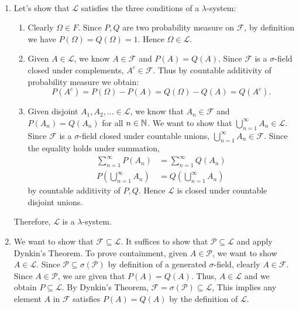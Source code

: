 \documentclass[12pt]{article}
\begin{document}
\begin{problem}[5]
~\begin{enumerate}[label=\alph*)]
	\item Let's show that $ \mathscr{L}$ satisfies the three conditions of a $\lambda$-system:
		\begin{enumerate}[label=(\roman*)]
			\item Clearly $ \Omega \in F$. Since $ P,Q$ are two probability measure on  $ \mathcal{F}$, by definition we have $ P(\Omega)=Q(\Omega)=1$. Hence $ \Omega \in \mathscr{L}$.
			\item Given $ A \in \mathscr{L}$, we know $ A \in \mathcal{F}$ and $ P(A) = Q(A)$. Since  $ \mathcal{F}$ is a $\sigma$-field closed under complements, $ A^{c} \in \mathcal{F}$. Thus by countable additivity of probability measure we obtain:
				\[
					P(A^{c}) = P(\Omega) - P(A) = Q(\Omega) - Q(A) = Q(A^{c})
				.\] 
			\item Given disjoint $ A_1, A_2, \ldots \in \mathscr{L}$, we know that $ A_n \in \mathcal{F}$ and $ P(A_n) = Q(A_n)$ for all $ n \in \mathbb{N}$. We want to show that $ \bigcup_{ n =1}^{\infty} A_n \in \mathscr{L}$. Since $ \mathcal{F}$ is a $\sigma$-field closed under countable unions, $ \bigcup_{ n =1}^{\infty} A_n \in \mathcal{F}$. Since the equality holds under summation,
				\begin{align*}
					\sum_{ n= 1}^{\infty} P(A_n) &= \sum_{ n= 1}^{\infty} Q(A_n) \\
					P\left( \bigcup_{ n =1}^{\infty} A_n \right) &=  Q\left( \bigcup_{ n =1}^{\infty} A_n \right)
				\end{align*}
by countable additivity of $P,Q$. Hence  $ \mathscr{L}$ is closed under countable disjoint unions. 
		\end{enumerate}
		Therefore, $ \mathscr{L}$ is a $\lambda$-system.
	\item We want to show that $ \mathcal{F} \subseteq \mathscr{L}$. It suffices to show that $ \mathcal{P} \subseteq \mathscr{L}$ and apply Dynkin's Theorem. To prove containment, given $ A \in \mathcal{P}$, we want to show $ A \in \mathscr{L}$. Since  $ \mathcal{P} \subseteq \sigma(\mathcal{P})$ by definition of a generated $\sigma$-field, clearly $ A \in \mathcal{F}$. Since $ A \in \mathcal{P}$, we are given that $ P(A) = Q(A)$. Thus,  $ A \in \mathscr{L}$ and we obtain $ P \subseteq \mathscr{L}$. By Dynkin's Theorem, $ \mathcal{F}= \sigma(\mathcal{P}) \subseteq \mathscr{L}$, This implies any element $ A$ in $ \mathcal{F}$ satisfies $ P(A)=Q(A)$ by the definition of $ \mathscr{L}$.
\end{enumerate}
\end{problem}
\end{document}
